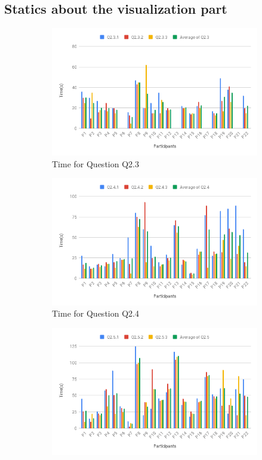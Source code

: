 \subsection{Statics about the visualization part}
\begin{figure}[h]
	\centering
	\begin{subfigure}[b]{0.48\textwidth}
		\centering
		\includegraphics[width=\textwidth]{pictures/q23}
		\caption{Time for Question Q2.3}
	\end{subfigure}
	\hfill
	\begin{subfigure}[b]{0.48\textwidth}
		\centering
		\includegraphics[width=\textwidth]{pictures/q24}
		\caption{Time for Question Q2.4}
	\end{subfigure}
	\hfill
	\begin{subfigure}[b]{0.48\textwidth}
		\centering
		\includegraphics[width=\textwidth]{pictures/q25}

\end{subfigure}
\end{figure}
